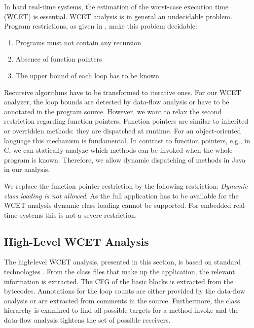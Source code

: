 In hard real-time systems, the estimation of the worst-case execution
time (WCET) is essential. WCET analysis is in general an undecidable
problem. Program restrictions, as given in \cite{pusch:maxt:jnl},
make this problem decidable:
\begin{enumerate}
    \item Programs must not contain any recursion
    \item Absence of function pointers
    \item The upper bound of each loop has to be known
\end{enumerate}
Recursive algorithms have to be transformed to iterative ones. For
our WCET analyzer, the loop bounds are detected by data-flow analysis
or have to be annotated in the program source. However, we want to
relax the second restriction regarding function pointers. Function
pointers are similar to inherited or overridden methods: they are
dispatched at runtime. For an object-oriented language this mechanism
is fundamental. In contrast to function pointers, e.g., in C, we can
statically analyze which methods can be invoked when the whole
program is known. Therefore, we allow dynamic dispatching of methods
in Java in our analysis.

We replace the function pointer restriction by the following
restriction: \emph{Dynamic class loading is not allowed}. As the full
application has to be available for the WCET analysis dynamic class
loading cannot be supported. For embedded real-time systems this is
not a severe restriction.

\subsection{High-Level WCET Analysis}

The high-level WCET analysis, presented in this section, is based on
standard technologies \cite{Puschner:JRTS1997, 216666}. From the
class files that make up the application, the relevant information is
extracted. The CFG of the basic blocks is extracted from the
bytecodes. Annotations for the loop counts are either provided by the
data-flow analysis or are extracted from comments in the source.
Furthermore, the class hierarchy is examined to find all possible
targets for a method invoke and the data-flow analysis tightens the
set of possible receivers.


